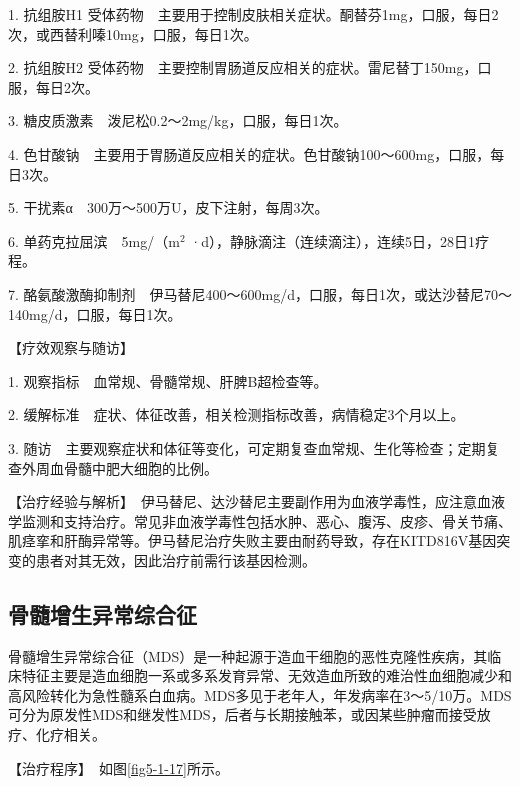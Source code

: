 1. 抗组胺H{1}
受体药物　主要用于控制皮肤相关症状。酮替芬1mg，口服，每日2次，或西替利嗪10mg，口服，每日1次。

2. 抗组胺H{2}
受体药物　主要控制胃肠道反应相关的症状。雷尼替丁150mg，口服，每日2次。

3. 糖皮质激素　泼尼松0.2～2mg/kg，口服，每日1次。

4.
色甘酸钠　主要用于胃肠道反应相关的症状。色甘酸钠100～600mg，口服，每日3次。

5. 干扰素α　300万～500万U，皮下注射，每周3次。

6. 单药克拉屈滨　5mg/（m$^2$
·d），静脉滴注（连续滴注），连续5日，28日1疗程。

7.
酪氨酸激酶抑制剂　伊马替尼400～600mg/d，口服，每日1次，或达沙替尼70～140mg/d，口服，每日1次。

【疗效观察与随访】

1. 观察指标　血常规、骨髓常规、肝脾B超检查等。

2. 缓解标准　症状、体征改善，相关检测指标改善，病情稳定3个月以上。

3.
随访　主要观察症状和体征等变化，可定期复查血常规、生化等检查；定期复查外周血骨髓中肥大细胞的比例。

【治疗经验与解析】　伊马替尼、达沙替尼主要副作用为血液学毒性，应注意血液学监测和支持治疗。常见非血液学毒性包括水肿、恶心、腹泻、皮疹、骨关节痛、肌痉挛和肝酶异常等。伊马替尼治疗失败主要由耐药导致，存在KITD816V基因突变的患者对其无效，因此治疗前需行该基因检测。

\subsection{骨髓增生异常综合征}

骨髓增生异常综合征（MDS）是一种起源于造血干细胞的恶性克隆性疾病，其临床特征主要是造血细胞一系或多系发育异常、无效造血所致的难治性血细胞减少和高风险转化为急性髓系白血病。MDS多见于老年人，年发病率在3～5/10万。MDS可分为原发性MDS和继发性MDS，后者与长期接触苯，或因某些肿瘤而接受放疗、化疗相关。

【治疗程序】　如图\ref{fig5-1-17}所示。

